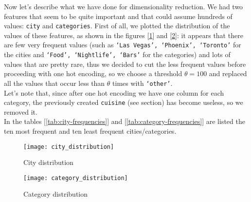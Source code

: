 Now let's describe what we have done for dimensionality reduction.
We had two features that seem to be quite important and that could assume hundreds of values: \texttt{city} and \texttt{categories}.
First of all, we plotted the distribution of the values of these features, as shown in the figures [\ref{fig:city-distribution}] and [\ref{fig:category-distribution}]: it appears that there are few very frequent values (such as \texttt{`Las Vegas', `Phoenix', `Toronto'} for the cities and \texttt{`Food', `Nightlife', `Bars'} for the categories) and lots of values that are pretty rare, thus we decided to cut the less frequent values before proceeding with one hot encoding, so we choose a threshold $\theta=100$ and replaced all the values that occur less than $\theta$ times with \texttt{`other'}.\\
Let's note that, since after one hot encoding we have one column for each category, the previously created \texttt{cuisine} (see  section) has become useless, so we removed it.\\
In the tables [\ref{tab:city-frequencies}] and [\ref{tab:category-frequencies}] are listed the ten most frequent and ten least frequent cities/categories.

\begin{figure}[h!]
	\centering
	\texttt{[image: city\_distribution]}
	\caption{City distribution}
	\label{fig:city-distribution}
\end{figure}

\begin{figure}[h!]
	\centering
	\texttt{[image: category\_distribution]}
	\caption{Category distribution}
	\label{fig:category-distribution}
\end{figure}

\newpage

